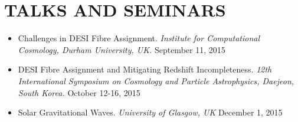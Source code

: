 \section{TALKS AND SEMINARS}
\begin{itemize}

\item Challenges in DESI Fibre Assignment. {\sl Institute for Computational Cosmology, Durham University, UK.} \hfill September 11, 2015
\item DESI Fibre Assignment and Mitigating Redshift Incompleteness. {\sl 12th International Symposium on Cosmology and Particle Astrophysics, Daejeon, South Korea.} \hfill \hfill October 12-16, 2015
\item Solar Gravitational Waves. {\sl University of Glasgow, UK} \hfill December 1, 2015
\end{itemize}